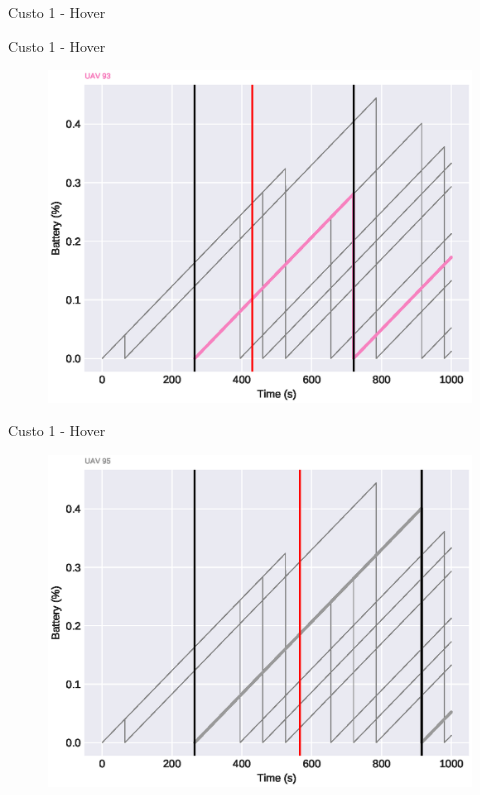 \begin{frame}{Custo 1 - Hover}
\begin{figure}[!htb]
                 \end{figure}
            \end{frame}\begin{frame}{Custo 1 - Hover}
                \begin{figure}[!htb]
                     \includegraphics[width=\textwidth]{custo_1/uav_hover_acum_uav_7.eps}
                 \end{figure}
            \end{frame}\begin{frame}{Custo 1 - Hover}
                \begin{figure}[!htb]
                     \includegraphics[width=\textwidth]{custo_1/uav_hover_acum_uav_9.eps}

\end{figure}
\end{frame}
